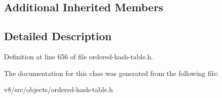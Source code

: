 \subsection*{Additional Inherited Members}


\subsection{Detailed Description}


Definition at line 656 of file ordered-\/hash-\/table.\+h.



The documentation for this class was generated from the following file\+:\begin{DoxyCompactItemize}
\item 
v8/src/objects/ordered-\/hash-\/table.\+h\end{DoxyCompactItemize}
